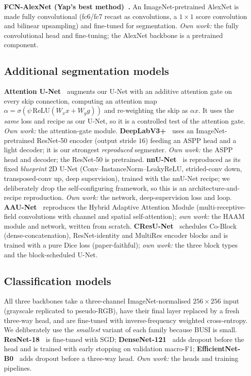 \documentclass[11pt]{article}
\begin{document}
\textbf{FCN-AlexNet (Yap's best method)~\cite{yap2018cnn}.} An ImageNet-pretrained
AlexNet is made fully convolutional (fc6/fc7 recast as convolutions, a $1\times1$
score convolution and bilinear upsampling) and fine-tuned for segmentation.
\emph{Own work:} the fully convolutional head and fine-tuning; the AlexNet
backbone is a pretrained component.

\subsection{Additional segmentation models}
\label{sec:repro-seg}
\textbf{Attention U-Net~\cite{oktay2018attentionunet}} augments our U-Net with an
additive attention gate on every skip connection, computing an attention map
$\alpha=\sigma(\psi\,\mathrm{ReLU}(W_x x + W_g g))$ and re-weighting the skip as
$\alpha x$. It uses the \emph{same} loss and recipe as our U-Net, so it is a
controlled test of the attention gate. \emph{Own work:} the attention-gate module.
\textbf{DeepLabV3+~\cite{chen2018deeplabv3plus}} uses an ImageNet-pretrained
ResNet-50 encoder (output stride $16$) feeding an ASPP head and a light decoder;
it is our strongest \emph{reproduced} segmenter. \emph{Own work:} the ASPP head and
decoder; the ResNet-50 is pretrained. \textbf{nnU-Net~\cite{isensee2021nnunet}} is
reproduced as its fixed \emph{blueprint} 2D U-Net (Conv--InstanceNorm--LeakyReLU,
strided-conv down, transposed-conv up, deep supervision), trained with the nnU-Net
recipe; we deliberately drop the self-configuring framework, so this is an
architecture-and-recipe reproduction. \emph{Own work:} the network,
deep-supervision loss and loop. \textbf{AAU-Net~\cite{chen2023aaunet}} reproduces
the Hybrid Adaptive Attention Module (multi-receptive-field convolutions with
channel and spatial self-attention); \emph{own work:} the HAAM module and network,
written from scratch. \textbf{CResU-Net~\cite{derakhshandeh2024cresunet}} schedules
Co-Block (dense-concatenation), ResNet-identity and MultiRes encoder blocks and is
trained with a pure Dice loss (paper-faithful); \emph{own work:} the three block
types and the block-scheduled U-Net.

\subsection{Classification models}
\label{sec:repro-cls}
All three backbones take a three-channel ImageNet-normalised $256\times256$ input
(grayscale replicated to pseudo-RGB), have their final layer replaced by a fresh
three-way head, and are fine-tuned with inverse-frequency weighted cross-entropy.
We deliberately use the \emph{smallest} variant of each family because BUSI is
small. \textbf{ResNet-18~\cite{he2016resnet}} is fine-tuned with SGD;
\textbf{DenseNet-121~\cite{huang2017densenet}} adds dropout before the head and is
trained with early stopping on validation macro-F1;
\textbf{EfficientNet-B0~\cite{tan2019efficientnet}} adds dropout before a
three-way head. \emph{Own work:} the heads and training pipelines.
\end{document}
